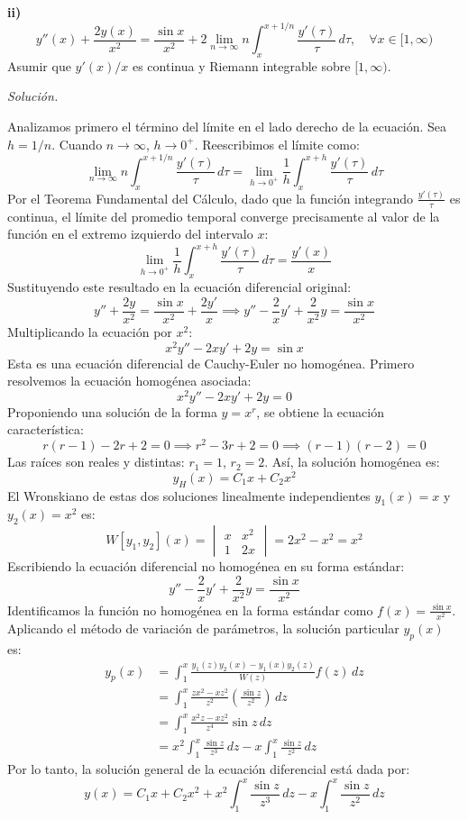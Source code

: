\documentclass[12pt,letterpaper]{article}
\begin{document}
\medskip
\textbf{ii)}
\begin{equation}
  y''(x) + \frac{2y(x)}{x^2} = \frac{\sin x}{x^2} + 2 \lim_{n \to \infty} n \int_x^{x + 1/n} \frac{y'(\tau)}{\tau} \, d\tau, \quad \forall x \in [1, \infty)
\end{equation}
Asumir que $y'(x)/x$ es continua y Riemann integrable sobre $[1, \infty)$.

\medskip
\textit{Solución.}

Analizamos primero el término del límite en el lado derecho de la ecuación. Sea $h = 1/n$. Cuando $n \to \infty$, $h \to 0^+$. Reescribimos el límite como:
\[
  \lim_{n \to \infty} n \int_x^{x + 1/n} \frac{y'(\tau)}{\tau} \, d\tau = \lim_{h \to 0^+} \frac{1}{h} \int_x^{x + h} \frac{y'(\tau)}{\tau} \, d\tau
\]
Por el Teorema Fundamental del Cálculo, dado que la función integrando $\frac{y'(\tau)}{\tau}$ es continua, el límite del promedio temporal converge precisamente al valor de la función en el extremo izquierdo del intervalo $x$:
\[
  \lim_{h \to 0^+} \frac{1}{h} \int_x^{x + h} \frac{y'(\tau)}{\tau} \, d\tau = \frac{y'(x)}{x}
\]
Sustituyendo este resultado en la ecuación diferencial original:
\[
  y'' + \frac{2y}{x^2} = \frac{\sin x}{x^2} + \frac{2 y'}{x} \implies y'' - \frac{2}{x} y' + \frac{2}{x^2} y = \frac{\sin x}{x^2}
\]
Multiplicando la ecuación por $x^2$:
\[
  x^2 y'' - 2x y' + 2y = \sin x
\]
Esta es una ecuación diferencial de Cauchy-Euler no homogénea.
Primero resolvemos la ecuación homogénea asociada:
\[
  x^2 y'' - 2x y' + 2y = 0
\]
Proponiendo una solución de la forma $y = x^r$, se obtiene la ecuación característica:
\[
  r(r - 1) - 2r + 2 = 0 \implies r^2 - 3r + 2 = 0 \implies (r - 1)(r - 2) = 0
\]
Las raíces son reales y distintas: $r_1 = 1$, $r_2 = 2$. Así, la solución homogénea es:
\[
  y_H(x) = C_1 x + C_2 x^2
\]
El Wronskiano de estas dos soluciones linealmente independientes $y_1(x) = x$ y $y_2(x) = x^2$ es:
\[
  W[y_1, y_2](x) = \begin{vmatrix} x & x^2 \\ 1 & 2x \end{vmatrix} = 2x^2 - x^2 = x^2
\]
Escribiendo la ecuación diferencial no homogénea en su forma estándar:
\[
  y'' - \frac{2}{x} y' + \frac{2}{x^2} y = \frac{\sin x}{x^2}
\]
Identificamos la función no homogénea en la forma estándar como $f(x) = \frac{\sin x}{x^2}$. Aplicando el método de variación de parámetros, la solución particular $y_p(x)$ es:
\begin{align*}
  y_p(x) &= \int_1^x \frac{y_1(z) y_2(x) - y_1(x) y_2(z)}{W(z)} f(z) \, dz \\
  &= \int_1^x \frac{z x^2 - x z^2}{z^2} \left( \frac{\sin z}{z^2} \right) \, dz \\
  &= \int_1^x \frac{x^2 z - x z^2}{z^4} \sin z \, dz \\
  &= x^2 \int_1^x \frac{\sin z}{z^3} \, dz - x \int_1^x \frac{\sin z}{z^2} \, dz
\end{align*}
Por lo tanto, la solución general de la ecuación diferencial está dada por:
\[
  y(x) = C_1 x + C_2 x^2 + x^2 \int_1^x \frac{\sin z}{z^3} \, dz - x \int_1^x \frac{\sin z}{z^2} \, dz
\]
\end{document}
